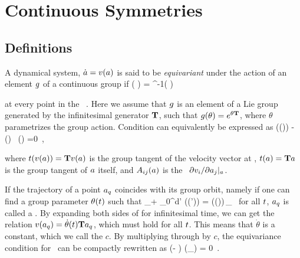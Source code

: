 \section{Continuous Symmetries}
\label{s:symm}

\subsection{Definitions}
\label{s:Definitions}

A dynamical system, $\dot{a}=v(a)$ is said to be \emph{equivariant} under the action of
an element $g$ of a continuous group if
\beq
	\vel( \ssp ) =  \LieEl^{-1}\vel( \LieEl \ssp )
	\,

\noindent at every point in the \statesp\ \pS. Here we assume that $g$ is an element of a Lie group generated by the infinitesimal generator $\mathbf{T}$, 
such that $g(\theta) = e^{\theta \mathbf{T}}$, where $\theta$ parametrizes the group action. Condition  can equivalently be expressed as
\beq
  \groupTan(\vel(\ssp))  - \Mvar(\ssp) \, \groupTan(\ssp) =0
  \,,

\noindent where $ t(v(a)) = \mathbf{T} v(a) $ is the group tangent of the velocity vector at \ssp, $ t(a) = \mathbf{T} a $ is the group tangent of $a$ itself, 
and $A_{ij}(a)$ is the \stabmat\ ${\partial v_i}/{\partial a_j} |_{a}$.



\label{s:relatives}

If the trajectory of a point $a_q$ coincides with its group
orbit, namely if one can find a group parameter $\theta (t)$ such that
\beq
  \ssp_\stagn + \int_0^\zeit d\zeit' \vel(\ssp (\zeit')) = \LieEl (\theta (\zeit))\,\ssp_\stagn
  \,
for all $t$, $a_q$ is called a \emph{\reqv}. By expanding both sides of 
for infinitesimal time, we can get the relation
$v(a_q) = \dot{\theta}(t) \mathbf{T} a_q$, which must hold for all $t$. This means that $\dot{\theta}$ is a constant, which we call the \emph{\phaseVel} $c$. 
By multiplying through by $c$, the equivariance
condition  for \reqva\ can be compactly rewritten as
\beq
(\velRel \Lg - \Mvar ) \vel (\ssp_\stagn) = 0
\,.

